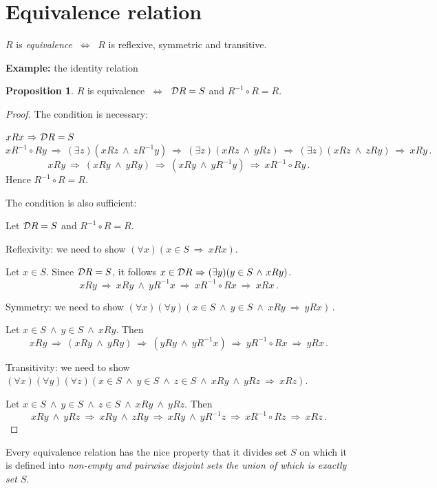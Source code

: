 \documentclass[11pt,paper=b5,footinclude,headinclude]{scrbook} %
\def\inn {{~\wedge~}}
\def\sledi {{~\Rightarrow~}}
\def\cee {{~\Leftrightarrow~}}
\theoremstyle{remark}
\theoremstyle{definition} %
\theoremstyle{theorem} %
\newtheorem*{proposition}{Proposition}
\begin{document}



\section{Equivalence relation}

$R$ is {\em equivalence} $\cee$ $R$ is reflexive, symmetric and transitive.

\textbf{ Example:} the identity relation

\begin{proposition}
$R$ is equivalence $\cee$ ${\cal D}R = S$ and $R^{-1}\circ R = R$.
\end{proposition}

\begin{proof}
The condition is necessary:

$xRx \sledi {\cal D}R = S$
$$xR^{-1}\circ Ry \sledi (\exists z)(xRz \inn zR^{-1}y)
\sledi (\exists z)(xRz \inn yRz)
\sledi (\exists z)(xRz \inn zRy)
\sledi xRy\,.$$
$$xRy
\sledi (xRy\inn yRy)
\sledi (xRy\inn yR^{-1}y)
\sledi xR^{-1}\circ Ry\,.$$
Hence $R^{-1}\circ R = R$.

The condition is also sufficient:

Let ${\cal D}R = S$ and $R^{-1}\circ R = R$.

Reflexivity: we need to show  $(\forall x)(x\in S\sledi xRx)$.

Let $x\in S$. Since ${\cal D}R = S$,
it follows $x\in {\cal D}R\sledi (\exists y)(y\in S\inn xRy)$.
$$xRy
\sledi xRy\inn yR^{-1}x
\sledi x R^{-1}\circ R x
\sledi xRx\,.$$

Symmetry: we need to show $(\forall x)(\forall y)(x\in S\inn y\in S\inn xRy\sledi yRx)\,.$

Let $x\in S\inn y\in S\inn xRy$.
Then
$$xRy \sledi (xRy\inn yRy)
\sledi (yRy\inn yR^{-1}x)
\sledi yR^{-1}\circ Rx
\sledi yRx\,.$$

Transitivity: we need to show $(\forall x)(\forall y)(\forall z)(x\in S\inn y\in S\inn z\in S\inn xRy\inn yRz\sledi xRz).$

Let $x\in S\inn y\in S\inn z\in S\inn xRy\inn yRz$.
Then $$xRy \inn yRz \sledi xRy\inn zRy
\sledi xRy\inn yR^{-1}z
\sledi xR^{-1}\circ Rz
\sledi xRz\,.$$
\end{proof}

Every equivalence relation has the nice property that it divides set $S$ on which it is defined into {\em non-empty and pairwise disjoint sets the union of which is exactly set $S$}.
\end{document}
